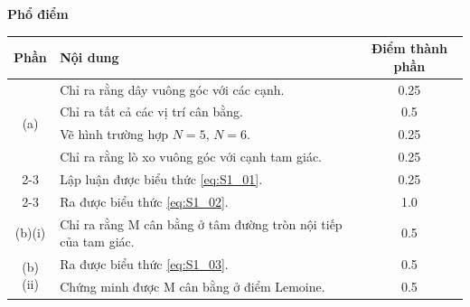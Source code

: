 \textbf{Phổ điểm}
    \begin{center}
    \begin{tabular}{|c|p{8cm}|c|}
    \hline
    \multicolumn{1}{|l|}{Phần} & Nội dung & Điểm thành phần \\ 
    \hline
\multirow{4}{*}{(a)} & Chỉ ra rằng dây vuông góc với các cạnh.
                     & 0.25
                     \\
                     \cline{2-3}
                     & Chỉ ra tất cả các vị trí cân bằng.      
                     & 0.5           
                     \\ 
                     \cline{2-3}
                     & Vẽ hình trường hợp $N = 5$, $N = 6$.        
                     & 0.25           
                     \\
                     \cline{2-3}
                     \hline  
\multirow{4}{*}{(b)} & Chỉ ra rằng lò xo vuông góc với cạnh tam giác.                                       & 0.25             
                     \\
                     \cline{2-3}
                     & Lập luận được biểu thức \eqref{eq:S1_01}. 
                     & 0.25
                     \\
                     \cline{2-3}
                     & Ra được biểu thức \eqref{eq:S1_02}. 
                     & 1.0
                     \\
                     \hline
\multirow{1}{*}{(b)(i)}& Chỉ ra rằng M cân bằng ở tâm đường tròn nội tiếp của tam giác.
                     & 0.5    
                     \\
                     \hline
\multirow{3}{*}{(b)(ii)}
                     &Ra được biểu thức \eqref{eq:S1_03}.     
                     & 0.5
                     \\
                     \cline{2-3}
                     & Chứng minh được M cân bằng ở điểm Lemoine.  
                     & 0.5
                     \\ \hline
                         


    \end{tabular}
    \end{center}

